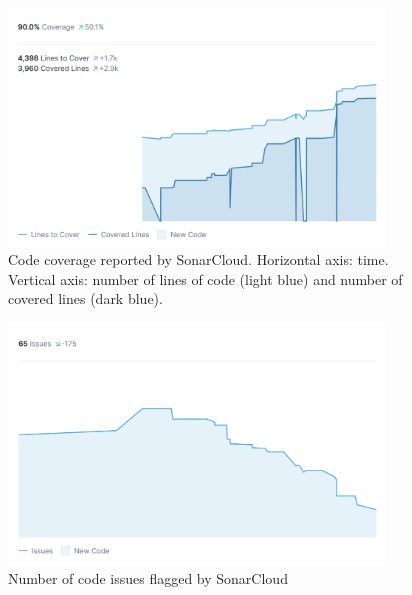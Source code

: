 \begin{figure}
\center
\includegraphics[width=10cm]{figures/code_coverage.png}
\caption{Code coverage reported by SonarCloud. Horizontal axis: time. Vertical axis: number of lines of code (light blue) and number of covered lines (dark blue).}
\label{fig:code_coverage}
\end{figure}

\begin{figure}
\center
\includegraphics[width=10cm]{figures/code_issues.png}
\caption{Number of code issues flagged by SonarCloud}
\label{fig:code_issues}
\end{figure}

